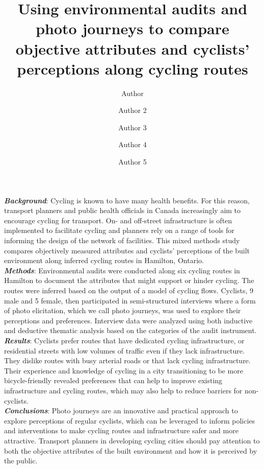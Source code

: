 \documentclass[]{elsarticle} %
\begin{document}
\begin{frontmatter}

  \title{Using environmental audits and photo journeys to compare objective
attributes and cyclists' perceptions along cycling routes}
    \author[Some School]{Author}
    \author[Some Department]{Author 2}
    \author[Some School]{Author 3}
    \author[Another Department]{Author 4}
    \author[Some School]{Author 5}
      \address[Some School]{School of X}
    \address[Some Department]{Department of Y}
    \address[Another Department]{Department of Z}
    
  \begin{abstract}
  
  \end{abstract}
  
 \end{frontmatter}

\textbf{\emph{Background}}: Cycling is known to have many health
benefits. For this reason, transport planners and public health
officials in Canada increasingly aim to encourage cycling for transport.
On- and off-street infrastructure is often implemented to facilitate
cycling and planners rely on a range of tools for informing the design
of the network of facilities. This mixed methods study compares
objectively measured attributes and cyclists' perceptions of the built
environment along inferred cycling routes in Hamilton, Ontario.\\
\textbf{\emph{Methods}}: Environmental audits were conducted along six
cycling routes in Hamilton to document the attributes that might support
or hinder cycling. The routes were inferred based on the output of a
model of cycling flows. Cyclists, 9 male and 5 female, then participated
in semi-structured interviews where a form of photo elicitation, which
we call photo journeys, was used to explore their perceptions and
preferences. Interview data were analyzed using both inductive and
deductive thematic analysis based on the categories of the audit
instrument.\\
\textbf{\emph{Results}}: Cyclists prefer routes that have dedicated
cycling infrastructure, or residential streets with low volumes of
traffic even if they lack infrastructure. They dislike routes with busy
arterial roads or that lack cycling infrastructure. Their experience and
knowledge of cycling in a city transitioning to be more bicycle-friendly
revealed preferences that can help to improve existing infrastructure
and cycling routes, which may also help to reduce barriers for
non-cyclists.\\
\textbf{\emph{Conclusions}}: Photo journeys are an innovative and
practical approach to explore perceptions of regular cyclists, which can
be leveraged to inform policies and interventions to make cycling routes
and infrastructure safer and more attractive. Transport planners in
developing cycling cities should pay attention to both the objective
attributes of the built environment and how it is perceived by the
public.
\end{document}
